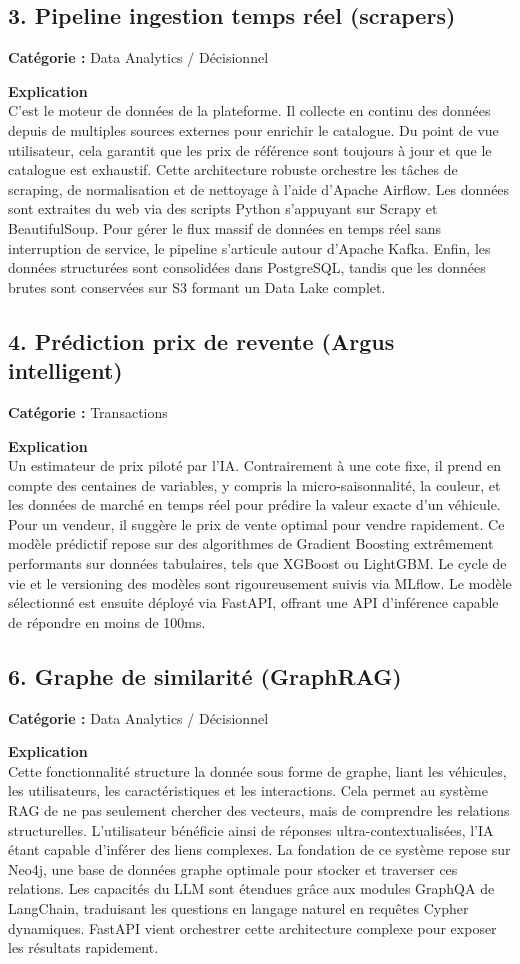 \documentclass[11pt,a4paper]{article}
\begin{document}
\subsection{3. Pipeline ingestion temps réel (scrapers)}
\textbf{Catégorie :} Data Analytics / Décisionnel

\textbf{Explication}\\
C'est le moteur de données de la plateforme. Il collecte en continu des données depuis de multiples sources externes pour enrichir le catalogue. Du point de vue utilisateur, cela garantit que les prix de référence sont toujours à jour et que le catalogue est exhaustif. Cette architecture robuste orchestre les tâches de scraping, de normalisation et de nettoyage à l'aide d'Apache Airflow. Les données sont extraites du web via des scripts Python s'appuyant sur Scrapy et BeautifulSoup. Pour gérer le flux massif de données en temps réel sans interruption de service, le pipeline s'articule autour d'Apache Kafka. Enfin, les données structurées sont consolidées dans PostgreSQL, tandis que les données brutes sont conservées sur S3 formant un Data Lake complet.

\subsection{4. Prédiction prix de revente (Argus intelligent)}
\textbf{Catégorie :} Transactions

\textbf{Explication}\\
Un estimateur de prix piloté par l'IA. Contrairement à une cote fixe, il prend en compte des centaines de variables, y compris la micro-saisonnalité, la couleur, et les données de marché en temps réel pour prédire la valeur exacte d'un véhicule. Pour un vendeur, il suggère le prix de vente optimal pour vendre rapidement. Ce modèle prédictif repose sur des algorithmes de Gradient Boosting extrêmement performants sur données tabulaires, tels que XGBoost ou LightGBM. Le cycle de vie et le versioning des modèles sont rigoureusement suivis via MLflow. Le modèle sélectionné est ensuite déployé via FastAPI, offrant une API d'inférence capable de répondre en moins de 100ms.


\subsection{6. Graphe de similarité (GraphRAG)}
\textbf{Catégorie :} Data Analytics / Décisionnel

\textbf{Explication}\\
Cette fonctionnalité structure la donnée sous forme de graphe, liant les véhicules, les utilisateurs, les caractéristiques et les interactions. Cela permet au système RAG de ne pas seulement chercher des vecteurs, mais de comprendre les relations structurelles. L'utilisateur bénéficie ainsi de réponses ultra-contextualisées, l'IA étant capable d'inférer des liens complexes. La fondation de ce système repose sur Neo4j, une base de données graphe optimale pour stocker et traverser ces relations. Les capacités du LLM sont étendues grâce aux modules GraphQA de LangChain, traduisant les questions en langage naturel en requêtes Cypher dynamiques. FastAPI vient orchestrer cette architecture complexe pour exposer les résultats rapidement.
\end{document}
